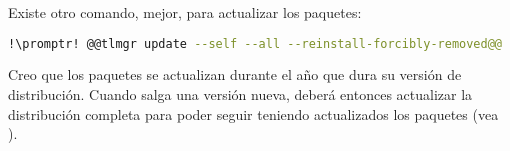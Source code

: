 Existe otro comando, mejor, para actualizar los paquetes:

\begin{lstlisting}[gobble=2,language=bash,style=bashinteract,escapechar=!]
  !\promptr! @@tlmgr update --self --all --reinstall-forcibly-removed@@
\end{lstlisting}

Creo que los paquetes se actualizan durante el año que dura su versión de distribución. Cuando salga una versión
nueva, deberá entonces actualizar la distribución completa para poder seguir teniendo actualizados los paquetes
(vea ).
